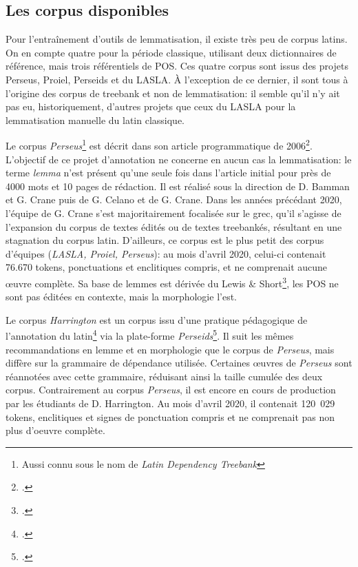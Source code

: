 \subsection{Les corpus disponibles}

Pour l'entraînement d'outils de lemmatisation, il existe très peu de corpus latins. On en compte quatre pour la période classique, utilisant deux dictionnaires de référence, mais trois référentiels de POS. Ces quatre corpus sont issus des projets Perseus, Proiel, Perseids et du LASLA. À l'exception de ce dernier, il sont tous à l'origine des corpus de treebank et non de lemmatisation: il semble qu'il n'y ait pas eu, historiquement, d'autres projets que ceux du LASLA pour la lemmatisation manuelle du latin classique.

Le corpus \textit{Perseus}\footnote{Aussi connu sous le nom de \textit{Latin Dependency Treebank}} est décrit dans son article programmatique de 2006\footcite{bamman_design_2006}. L'objectif de ce projet d'annotation ne concerne en aucun cas la lemmatisation: le terme \textit{lemma} n'est présent qu'une seule fois dans l'article initial pour près de 4000 mots et 10 pages de rédaction. Il est réalisé sous la direction de D. Bamman et G. Crane puis de G. Celano et de G. Crane. Dans les années précédant 2020, l'équipe de G. Crane s'est majoritairement focalisée sur le grec, qu'il s'agisse de l'expansion du corpus de textes édités ou de textes treebankés, résultant en une stagnation du corpus latin. D'ailleurs, ce corpus est le plus petit des corpus d'équipes (\textit{LASLA, Proiel, Perseus}): au mois d'avril 2020, celui-ci contenait 76.670 tokens, ponctuations et enclitiques compris, et ne comprenait aucune œuvre complète. Sa base de lemmes est dérivée du Lewis \& Short\footcite{shorts_latin_1958}, les POS ne sont pas éditées en contexte, mais la morphologie l'est.

Le corpus \textit{Harrington} est un corpus issu d'une pratique pédagogique de l'annotation du latin\footcite{noauthor_harrington_nodate} via la plate-forme \textit{Perseids}\footcite{almas_perseids_2016}. Il suit les mêmes recommandations en lemme et en morphologie que le corpus de \textit{Perseus}, mais diffère sur la grammaire de dépendance utilisée. Certaines œuvres de \textit{Perseus} sont réannotées avec cette grammaire, réduisant ainsi la taille cumulée des deux corpus. Contrairement au corpus \textit{Perseus}, il est encore en cours de production par les étudiants de D. Harrington. Au mois d'avril 2020, il contenait 120~029 tokens, enclitiques et signes de ponctuation compris et ne comprenait pas non plus d'oeuvre complète. 


